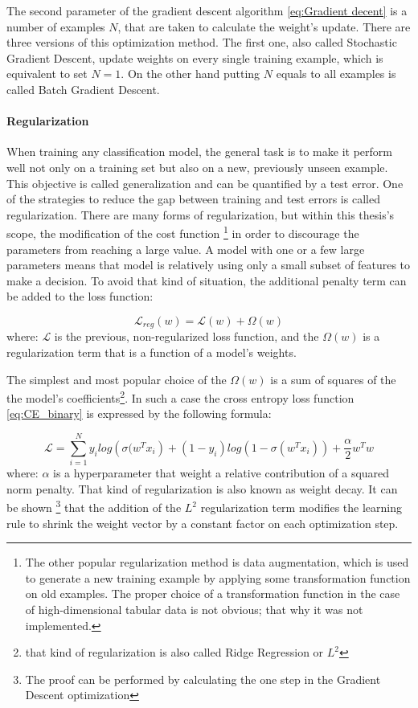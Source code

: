 The second parameter of the gradient descent algorithm \ref{eq:Gradient decent} is a number of examples $N$, that are taken to calculate the weight's update. There are three versions of this optimization method. The first one, also called Stochastic Gradient Descent, update weights on every single training example, which is equivalent to set $N=1$. On the other hand putting $N$ equals to all examples is called Batch Gradient Descent.  

\paragraph{Regularization} \mbox{}


When training any classification model, the general task is to make it perform well not only on a training set but also on a new, previously unseen example. This objective is called generalization and can be quantified by a test error. One of the strategies to reduce the gap between training and test errors is called regularization. There are many forms of regularization, but within this thesis's scope, the modification of the cost function \footnote{The other popular regularization method is data augmentation, which is used to generate a new training example by applying some transformation function on old examples. The proper choice of a transformation function in the case of high-dimensional tabular data is not obvious; that why it was not implemented.} in order to discourage the parameters from reaching a large value. A model with one or a few large parameters means that model is relatively using only a small subset of features to make a decision. To avoid that kind of situation, the additional penalty term can be added to the loss function: 

\begin{equation}
    \mathcal{L}_{reg}(w) = \mathcal{L}(w) + \Omega(w) 
\end{equation}
where: $\mathcal{L}$ is the previous, non-regularized loss function, and the $\Omega(w)$ is a regularization term that is a function of a model's weights. 

The simplest and most popular choice of the $\Omega(w)$ is a sum of squares of the the model's coefficients\footnote{that kind of regularization is also called Ridge Regression or $L^2$}. In such a case the cross entropy loss function \ref{eq:CE_binary} is expressed by the following formula:

\begin{equation}
    \mathcal{L} =  \sum_{i=1}^{N}y_{i}log\left( \sigma(w^{T}x_{i}\right)+(1-y_i)log(1-\sigma(w^{T}x_{i})) + \frac{\alpha}{2} w^{T}w
\end{equation}
where: $\alpha$ is a hyperparameter that weight a relative contribution of a squared norm penalty. 
That kind of regularization is also known as weight decay. It can be shown \footnote{The proof can be performed by calculating the one step in the Gradient Descent optimization} that the addition of the $L^2$  regularization term modifies the learning rule to shrink the weight vector by a constant factor on each optimization step. 

